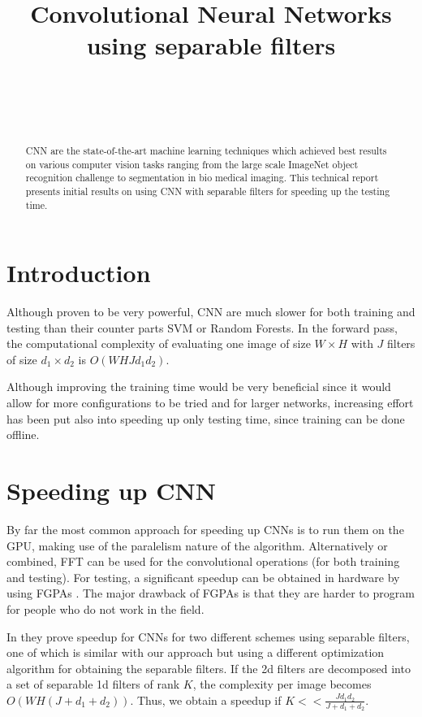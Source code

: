 \documentclass{article} %
\title{Convolutional Neural Networks using separable filters}
\author{
\fontsize{8}{8}\selectfont{Petrescu Viviana}\\
\fontsize{8}{8}\selectfont{EPFL} \\
\fontsize{8}{8}\selectfont{\texttt{viviana.petrescu@epfl.ch}} \\
}
\begin{document}
\maketitle

\begin{abstract}
CNN are the state-of-the-art machine learning techniques which achieved best results on various computer vision tasks ranging from the large scale ImageNet object recognition challenge to segmentation in bio medical imaging.
This technical report presents initial results on using CNN with separable filters for speeding up the testing time.
\end{abstract}

\section{Introduction}
Although proven to be very powerful, CNN are much slower for both training and testing than their counter parts SVM or Random Forests.
In the forward pass, the computational complexity of evaluating one image of size $W\times H$ with $J$ filters of size $d_{1}\times d_{2}$ is $O(WHJd_{1}d_{2})$.
 
 Although improving the training time would be very beneficial since it would allow for more configurations to be tried and for larger networks, increasing effort has been put also into speeding up only testing time, since training can be done offline.

\section{Speeding up CNN}
By far the most common approach for speeding up CNNs is to run them on the GPU, making use of the paralelism nature of the algorithm. Alternatively or combined, FFT can be used for the convolutional operations (for  both training and testing)\cite{DBLP:journals/corr/MathieuHL13}.  For testing, a significant speedup can be obtained in hardware by using FGPAs \citep{lecun2010convolutional}. The major drawback of FGPAs is that they are harder to program for people who do not work in the field.

 In \citep{Jaderberg14b} they prove speedup for CNNs for two different schemes using separable filters, one of which is similar with our approach but using a different optimization algorithm for obtaining the separable filters. 
  If the 2d filters are decomposed into a set of separable 1d filters of rank $K$, the complexity per image becomes
 $O(WH(J +d_{1}+d_{2}))$. Thus, we obtain a speedup if $K<< \frac{Jd_{1}d_{2}}{J +d_{1}+d_{2}}$. 
 
\end{document}
